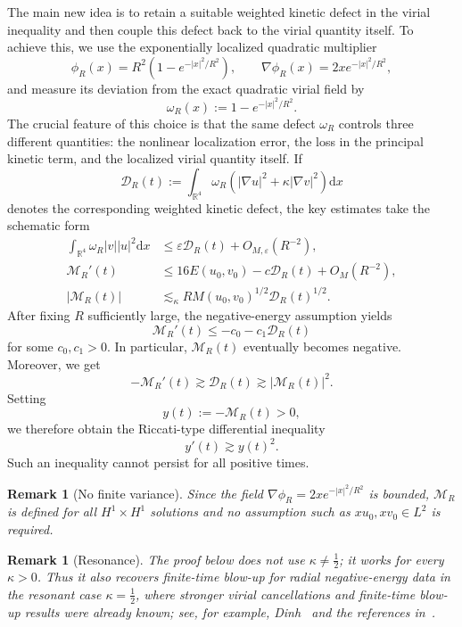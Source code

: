\documentclass[10pt,a4paper]{amsart}
\numberwithin{equation}{section}
\newtheorem{remark}[theorem]{Remark}
\newcommand{\dd}{\mathrm{d}x}
\begin{document}
The main new idea is to retain a suitable weighted kinetic defect in the virial inequality and then couple this defect back to the virial quantity itself. To achieve this, we use the exponentially localized quadratic multiplier
\begin{equation*}
\phi_R(x) = R^2\left(1-e^{-|x|^2/R^2}\right), \qquad \nabla\phi_R(x)= 2x e^{-|x|^2/R^2},
\end{equation*}
and measure its deviation from the exact quadratic virial field by
\begin{equation*}
\omega_R(x) := 1-e^{-|x|^2/R^2}.
\end{equation*}
The crucial feature of this choice is that the same defect $\omega_R$ controls three different quantities: the nonlinear localization error, the loss in the principal kinetic term, and the localized virial quantity itself. If 
\[
\mathcal D_R(t):=\int_{\mathbb R^4}\omega_R\left(|\nabla u|^2+\kappa|\nabla v|^2\right)\dd
\] 
denotes the corresponding weighted kinetic defect, the key estimates take the schematic form
\begin{align*}
\int_{\mathbb R^4}\omega_R|v||u|^2\dd &\le \varepsilon \mathcal D_R(t) +O_{M,\varepsilon}(R^{-2}),\\
\mathcal M_R'(t) &\le 16E(u_0,v_0)-c\mathcal D_R(t)+O_M(R^{-2}),\\
|\mathcal M_R(t)| &\lesssim_\kappa R M(u_0,v_0)^{1/2}\mathcal D_R(t)^{1/2}.
\end{align*}
After fixing $R$ sufficiently large, the negative-energy assumption yields
\[
\mathcal M_R'(t) \le -c_0-c_1\mathcal D_R(t)
\]
for some $c_0,c_1>0$. In particular, $\mathcal M_R(t)$ eventually becomes negative. Moreover, we get
\[ 
-\mathcal M_R'(t) \gtrsim  \mathcal D_R(t) \gtrsim  |\mathcal M_R(t)|^2.
\]
Setting
\[
 y(t):=-\mathcal M_R(t)>0,
\]
we therefore obtain the Riccati-type differential inequality
\[
 y'(t)\gtrsim y(t)^2.
\]
Such an inequality cannot persist for all positive times.

\begin{remark}[No finite variance]
Since the field $\nabla \phi_R=2xe^{-|x|^2/R^2}$ is bounded, $\mathcal M_R$ is defined for all $H^1\times H^1$ solutions and no assumption such as $xu_0,xv_0\in L^2$ is required. 
\end{remark}

\begin{remark}[Resonance]
The proof below does not use $\kappa\neq\frac12$; it works for every $\kappa>0$. Thus it also recovers finite-time blow-up for radial negative-energy data in the resonant case $\kappa=\frac12$, where stronger virial cancellations and finite-time blow-up results were already known; see, for example, Dinh~\cite{Dinh, Dinh-2} and the references in~\cite{DF}.
\end{remark}
\end{document}
